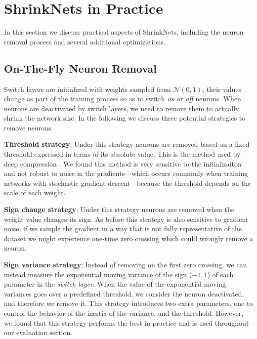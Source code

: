 
\section{ShrinkNets in Practice}

In this section we discuss practical aspects of ShrinkNets, including the
neuron removal  process and several additional optimizations.

\subsection{On-The-Fly Neuron Removal}
\label{neuron_killing}

Switch layers are initialized with weights sampled from $\mathcal{N}(0,1)$;
their values change as part of the training process so as to switch \emph{on}
or \emph{off} neurons. When neurons are deactivated by switch layers, we need
to remove them to actually shrink the network size.
In the following we discuss three potential strategies to remove neurons. 

\textbf{Threshold strategy}: Under this strategy neurons are removed based on
a fixed threshold expressed in terms of its absolute value. This is the method
used by deep compression \cite{Han2015}. We found this method is very sensitive to the initializaiton 
and not robust to noise in the gradients---which occurs commonly when training networks with
stochastic gradient descent---because the threshold depends on the scale of
each weight.

\textbf{Sign change strategy}: Under this strategy neurons are removed when the
weight value changes its sign. As before this strategy is also sensitive to gradient noise; if we sample the gradient in a way that is not fully representative of the dataset we might experience one-time zero crossing which could wrongly remove a neuron.

\textbf{Sign variance strategy}: Instead of removing on the first zero
crossing, we can instead measure the exponential moving variance of the sign
($-1, 1$) of each parameter in the \textit{switch layer}. When the value of
the exponential moving variances goes over a predefined threshold, we consider
the neuron deactivated, and therefore we remove it. This strategy introduces
two extra parameters, one to control the behavior of the inertia of the
variance, and the threshold. 
However, we found that this strategy performs the best in practice and is used throughout our evaluation section. 

